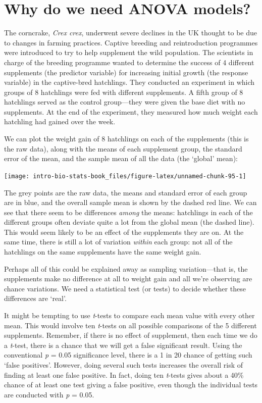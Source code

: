 \documentclass[
]{book}
\begin{document}
\hypertarget{why-do-we-need-anova-models}{%
\section{Why do we need ANOVA models?}\label{why-do-we-need-anova-models}}

The corncrake, \emph{Crex crex}, underwent severe declines in the UK thought to be due to changes in farming practices. Captive breeding and reintroduction programmes were introduced to try to help supplement the wild population. The scientists in charge of the breeding programme wanted to determine the success of 4 different supplements (the predictor variable) for increasing initial growth (the response variable) in the captive-bred hatchlings. They conducted an experiment in which groups of 8 hatchlings were fed with different supplements. A fifth group of 8 hatchlings served as the control group---they were given the base diet with no supplements. At the end of the experiment, they measured how much weight each hatchling had gained over the week.

We can plot the weight gain of 8 hatchlings on each of the supplements (this is the raw data), along with the means of each supplement group, the standard error of the mean, and the sample mean of all the data (the `global' mean):

\begin{center}\texttt{[image: intro-bio-stats-book\_files/figure-latex/unnamed-chunk-95-1]} \end{center}

The grey points are the raw data, the means and standard error of each group are in blue, and the overall sample mean is shown by the dashed red line. We can see that there seem to be differences \emph{among} the means: hatchlings in each of the different groups often deviate quite a lot from the global mean (the dashed line). This would seem likely to be an effect of the supplements they are on. At the same time, there is still a lot of variation \emph{within} each group: not all of the hatchlings on the same supplements have the same weight gain.

Perhaps all of this could be explained away as sampling variation---that is, the supplements make no difference at all to weight gain and all we're observing are chance variations. We need a statistical test (or tests) to decide whether these differences are `real'.

It might be tempting to use \emph{t}-tests to compare each mean value with every other mean. This would involve ten \emph{t}-tests on all possible comparisons of the 5 different supplements. Remember, if there is no effect of supplement, then each time we do a \emph{t}-test, there is a chance that we will get a false significant result. Using the conventional \emph{p} = 0.05 significance level, there is a 1 in 20 chance of getting such `false positives'. However, doing several such tests increases the overall risk of finding at least one false positive. In fact, doing ten \emph{t}-tests gives about a 40\% chance of at least one test giving a false positive, even though the individual tests are conducted with \emph{p} = 0.05.
\end{document}
